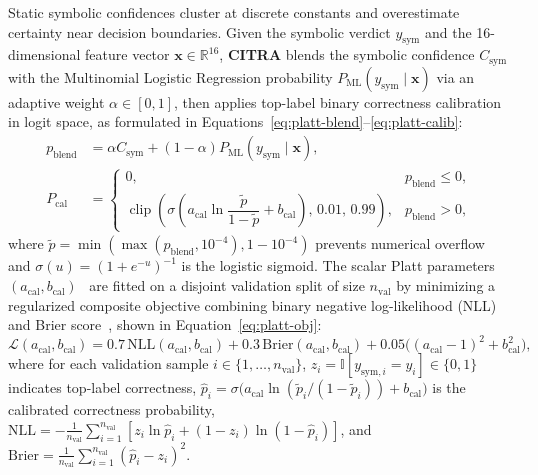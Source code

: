 Static symbolic confidences cluster at discrete constants and overestimate certainty near decision boundaries. Given the symbolic verdict $y_{\text{sym}}$ and the 16-dimensional feature vector $\mathbf{x} \in \mathbb{R}^{16}$, \textbf{CITRA} blends the symbolic confidence $C_{\text{sym}}$ with the Multinomial Logistic Regression probability $P_{\text{ML}}(y_{\text{sym}} \mid \mathbf{x})$ via an adaptive weight $\alpha \in [0, 1]$, then applies top-label binary correctness calibration in logit space, as formulated in Equations~\eqref{eq:platt-blend}--\eqref{eq:platt-calib}:
\begin{align}
p_{\text{blend}} &= \alpha C_{\text{sym}} + (1 - \alpha) P_{\text{ML}}(y_{\text{sym}} \mid \mathbf{x}), \label{eq:platt-blend}\\
P_{\text{cal}} &= \begin{cases}
0, & p_{\text{blend}} \le 0,\\
\operatorname{clip}\!\left(\sigma\!\left(a_{\text{cal}} \ln\dfrac{\tilde{p}}{1 - \tilde{p}} + b_{\text{cal}}\right),\, 0.01,\, 0.99\right), & p_{\text{blend}} > 0,
\end{cases} \label{eq:platt-calib}
\end{align}
where $\tilde{p} = \min(\max(p_{\text{blend}}, 10^{-4}), 1 - 10^{-4})$ prevents numerical overflow and $\sigma(u) = (1 + e^{-u})^{-1}$ is the logistic sigmoid. The scalar Platt parameters $(a_{\text{cal}}, b_{\text{cal}})$~\cite{platt1999} are fitted on a disjoint validation split of size $n_{\text{val}}$ by minimizing a regularized composite objective combining binary negative log-likelihood (NLL) and Brier score~\cite{brier1950}, shown in Equation~\eqref{eq:platt-obj}:
\begin{equation}\label{eq:platt-obj}
\mathcal{L}(a_{\text{cal}}, b_{\text{cal}}) = 0.7\,\mathrm{NLL}(a_{\text{cal}}, b_{\text{cal}}) + 0.3\,\mathrm{Brier}(a_{\text{cal}}, b_{\text{cal}}) + 0.05\bigl((a_{\text{cal}} - 1)^2 + b_{\text{cal}}^2\bigr),
\end{equation}
where for each validation sample $i \in \{1, \dots, n_{\text{val}}\}$, $z_i = \mathbb{I}[y_{\text{sym},i} = y_i] \in \{0, 1\}$ indicates top-label correctness, $\hat{p}_i = \sigma\bigl(a_{\text{cal}}\ln(\tilde{p}_i / (1 - \tilde{p}_i)) + b_{\text{cal}}\bigr)$ is the calibrated correctness probability, $\mathrm{NLL} = -\frac{1}{n_{\text{val}}}\sum_{i=1}^{n_{\text{val}}}[z_i\ln\hat{p}_i + (1 - z_i)\ln(1 - \hat{p}_i)]$, and $\mathrm{Brier} = \frac{1}{n_{\text{val}}}\sum_{i=1}^{n_{\text{val}}}(\hat{p}_i - z_i)^2$.

